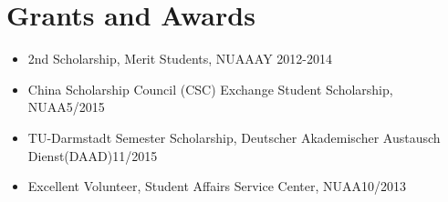 \documentclass{article}
\begin{document}
\section{Grants and Awards}
\begin{itemize}[noitemsep,topsep=1pt]
\item 2nd Scholarship, Merit Students, NUAA\hfill AY 2012-2014
\item China Scholarship Council (CSC) Exchange Student Scholarship, NUAA\hfill 5/2015
\item TU-Darmstadt Semester Scholarship, Deutscher Akademischer Austausch Dienst(DAAD)\hfill 11/2015
\item Excellent Volunteer, Student Affairs Service Center, NUAA\hfill 10/2013
\end{itemize}
\end{document}
